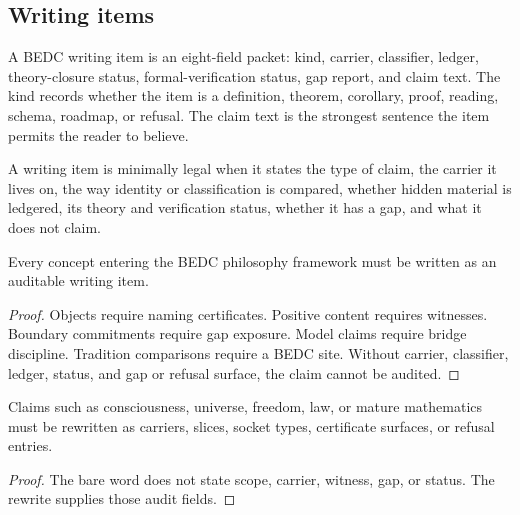 \subsection{Writing items}
\label{subsec:philosophy-writing-items}

\begin{definition}
\label{def:philosophy-writing-item}
A BEDC writing item is an eight-field packet:
kind, carrier, classifier, ledger, theory-closure status,
formal-verification status, gap report, and claim text. The kind
records whether the item is a definition, theorem, corollary, proof,
reading, schema, roadmap, or refusal. The claim text is the strongest
sentence the item permits the reader to believe.
\end{definition}

\begin{definition}
\label{def:philosophy-writing-item-minimal-legality}
A writing item is minimally legal when it states the type of claim, the
carrier it lives on, the way identity or classification is compared,
whether hidden material is ledgered, its theory and verification
status, whether it has a gap, and what it does not claim.
\end{definition}

\begin{theorem}
\label{thm:philosophy-writing-items-auditable}
Every concept entering the BEDC philosophy framework must be written as
an auditable writing item.
\end{theorem}
\begin{proof}
Objects require naming certificates. Positive content requires
witnesses. Boundary commitments require gap exposure. Model claims
require bridge discipline. Tradition comparisons require a BEDC site.
Without carrier, classifier, ledger, status, and gap or refusal
surface, the claim cannot be audited.
\end{proof}

\begin{corollary}
\label{cor:philosophy-concepts-not-bare-prose}
Claims such as consciousness, universe, freedom, law, or mature
mathematics must be rewritten as carriers, slices, socket types,
certificate surfaces, or refusal entries.
\end{corollary}
\begin{proof}
The bare word does not state scope, carrier, witness, gap, or status.
The rewrite supplies those audit fields.
\end{proof}

